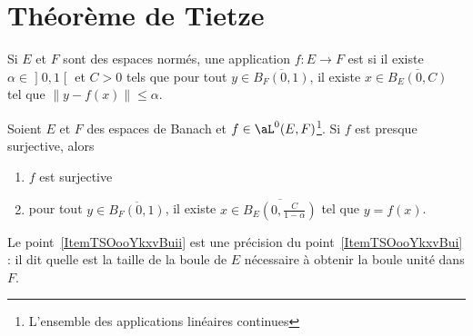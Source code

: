 \section{Théorème de Tietze}

\begin{definition}
	Si \( E\) et \( F\) sont des espaces normés, une application \( f\colon E\to F\) est  si il existe \( \alpha\in\mathopen] 0 , 1 \mathclose[\) et \( C>0\) tels que pour tout \( y\in \overline{ B_F(0,1) }\), il existe \( x\in\overline{ B_E(0,C) }\) tel que \( \| y-f(x) \|\leq \alpha\).
\end{definition}

\begin{lemma}   \label{LemBQLooRXhJzK}
	Soient \( E\) et \( F\) des espaces de Banach et \( f\in\aL^0(E,F)\)\footnote{L'ensemble des applications linéaires continues}. Si \( f\) est presque surjective, alors
	\begin{enumerate}
		\item   \label{ItemTSOooYkxvBui}
		      \( f\) est surjective
		      \item\label{ItemTSOooYkxvBuii}
		      pour tout \( y\in \overline{ B_F(0,1) }\), il existe \( x\in\overline{ B_E(0,\frac{ C }{ 1-\alpha }) }\) tel que \( y=f(x)\).
	\end{enumerate}
\end{lemma}
Le point~\ref{ItemTSOooYkxvBuii} est une précision du point~\ref{ItemTSOooYkxvBui} : il dit quelle est la taille de la boule de \( E\) nécessaire à obtenir la boule unité dans \( F\).

